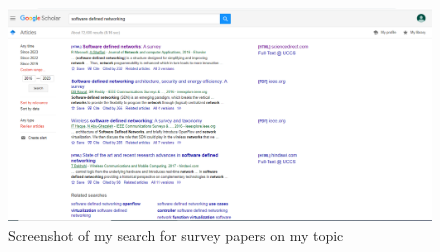 \documentclass{article}
\begin{document}
\begin{figure}[htbp]
    \center
    \includegraphics[scale=0.4]{screenshot.png}
    \caption{Screenshot of my search for survey papers on my topic}
\end{figure}










\end{document}

